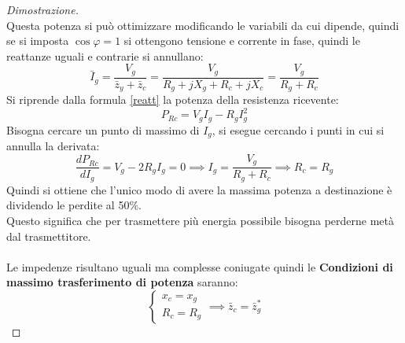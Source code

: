 \documentclass[../main.tex]{subfiles}
\begin{document}
\begin{proof}[Dimostrazione]
\begin{equation}
		\end{equation}
		Questa potenza si può ottimizzare modificando le variabili da cui dipende, quindi se si imposta $\cos\varphi = 1$ si ottengono tensione e corrente in fase, quindi le reattanze uguali e contrarie si annullano:
		\begin{equation}
			\bar I_g = \frac{V_g}{\bar z_y + \bar z_c} = \frac{V_g}{R_g+jX_g + R_c+jX_c} = \frac{V_g}{R_g+R_c}	
		\end{equation}
		Si riprende dalla formula \ref{reatt} la potenza della resistenza ricevente:
		\begin{equation}
			P_{Rc} = V_gI_g	-R_gI_g^2
		\end{equation}
		Bisogna cercare un punto di massimo di $I_g$, si esegue cercando i punti in cui si annulla la derivata:
		\begin{equation}
			\frac{dP_{Rc}}{dI_g}=V_g-2R_gI_g = 0 \implies I_g = \frac{V_g}{R_g+R_c}\implies R_c=R_g	
		\end{equation}
		Quindi si ottiene che l'unico modo di avere la massima potenza a destinazione è dividendo le perdite al 50\%. \\
		Questo significa che per trasmettere più energia possibile bisogna perderne metà dal trasmettitore.\\\\
		Le impedenze risultano uguali ma complesse coniugate quindi le \textbf{Condizioni di massimo trasferimento di potenza} saranno:
		\begin{equation}
			\begin{cases}
				x_c = x_g \\
				R_c = R_g
			\end{cases}	\implies \bar z_c = \bar z_g ^\ast
		\end{equation}
	\end{proof}
\end{document}
